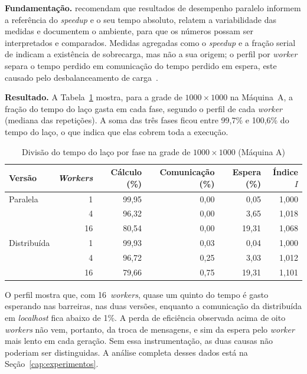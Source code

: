 \textbf{Fundamentação.}  recomendam que resultados de desempenho paralelo informem a referência do \textit{speedup} e o seu tempo absoluto, relatem a variabilidade das medidas e documentem o ambiente, para que os números possam ser interpretados e comparados. Medidas agregadas como o \textit{speedup} e a fração serial de  indicam a existência de sobrecarga, mas não a sua origem; o perfil por \textit{worker} separa o tempo perdido em comunicação do tempo perdido em espera, este causado pelo desbalanceamento de carga~\cite{Foster1995}.

\textbf{Resultado.} A Tabela~\ref{tab:melhoria-perfil} mostra, para a grade de $1000 \times 1000$ na Máquina~A, a fração do tempo do laço gasta em cada fase, segundo o perfil de cada \textit{worker} (mediana das repetições). A soma das três fases ficou entre 99,7\% e 100,6\% do tempo do laço, o que indica que elas cobrem toda a execução.

\begin{table}[htb]
    \centering
    \caption{Divisão do tempo do laço por fase na grade de $1000 \times 1000$ (Máquina A)}
    \label{tab:melhoria-perfil}
    \begin{tabular}{lrrrrr}
        \toprule
        \textbf{Versão} & \textbf{\textit{Workers}} & \textbf{Cálculo (\%)} & \textbf{Comunicação (\%)} & \textbf{Espera (\%)} & \textbf{Índice $I$} \\
        \midrule
        Paralela    & 1  & 99,95 & 0,00 & 0,05  & 1,000 \\
                    & 4  & 96,32 & 0,00 & 3,65  & 1,018 \\
                    & 16 & 80,54 & 0,00 & 19,31 & 1,068 \\
        \midrule
        Distribuída & 1  & 99,93 & 0,03 & 0,04  & 1,000 \\
                    & 4  & 96,72 & 0,25 & 3,03  & 1,012 \\
                    & 16 & 79,66 & 0,75 & 19,31 & 1,101 \\
        \bottomrule
    \end{tabular}
    \fonte{}
\end{table}

O perfil mostra que, com 16~\textit{workers}, quase um quinto do tempo é gasto esperando nas barreiras, nas duas versões, enquanto a comunicação da distribuída em \textit{localhost} fica abaixo de 1\%. A perda de eficiência observada acima de oito \textit{workers} não vem, portanto, da troca de mensagens, e sim da espera pelo \textit{worker} mais lento em cada geração. Sem essa instrumentação, as duas causas não poderiam ser distinguidas. A análise completa desses dados está na Seção~\ref{cap:experimentos}.

